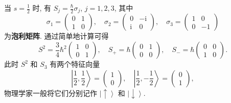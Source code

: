 \begin{example}[$\frac{1}{2}$ 自旋]
    当 $ s=\frac{1}{2} $ 时, 有 $ S_j=\frac{\hbar}{2}\sigma_j $, $ j=1,2,3 $, 其中
    \[ \sigma_1=\left(\begin{matrix}
        0 & 1\\ 
        1 & 0
    \end{matrix}\right),\quad\sigma_2=\left(\begin{matrix}
        0 & -\mathrm{i}\\ 
        \mathrm{i} & 0
    \end{matrix}\right),\quad\sigma_3=\left(\begin{matrix}
        1 & 0\\ 
        0 & -1
    \end{matrix}\right) \]
    为{\bf 泡利矩阵}. 通过简单地计算可得
    \[ S^2=\frac{3}{4}\hbar^2 \left(\begin{matrix}
        1 & 0\\ 
        0 & 1
    \end{matrix}\right),\quad S_+=\hbar \left(\begin{matrix}
        0 & 1\\ 
        0 & 0
    \end{matrix}\right),\quad S_-=\hbar \left(\begin{matrix}
        0 & 0\\ 
        1 & 0
    \end{matrix}\right). \]
    此时 $ S^2 $ 和 $ S_3 $ 有两个特征向量 
    \[ \left|\frac{1}{2},\frac{1}{2}\right\rangle=\left(\begin{matrix}
        1 \\ 0
    \end{matrix}\right),\quad  \left|\frac{1}{2},-\frac{1}{2}\right\rangle=\left(\begin{matrix}
        0 \\ 1
    \end{matrix}\right),\] 
    物理学家一般将它们分别记作 $ \left|\uparrow\right\rangle $ 和 $ \left|\downarrow\right\rangle $.
\end{example}